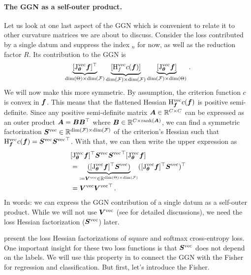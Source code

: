 \paragraph{The GGN as a self-outer product.}
Let us look at one last aspect of the GGN which is convenient to relate it to other curvature matrices we are about to discuss.
Consider the loss contributed by a single datum and suppress the index $_n$ for now, as well as the reduction factor $R$.
Its contribution to the GGN is
\begin{align*}
  \underbrace{[\mathrm{J}_{{\bm{\theta}}}^{\operatorname{vec}} {\bm{f}}]^{\top}}_{\dim(\Theta) \times \dim({\mathcal{F}})}
  \underbrace{[\mathrm{H}^{\operatorname{vec}}_{f} c({\bm{f}})]}_{\dim({\mathcal{F}}) \times \dim({\mathcal{F}})}
  \underbrace{[\mathrm{J}_{{\bm{\theta}}}^{\operatorname{vec}} {\bm{f}}]}_{\dim({\mathcal{F}}) \times \dim(\Theta)}\,.
\end{align*}
We will now make this more symmetric.
By assumption, the criterion function $c$ is convex in ${\bm{f}}$.
This means that the flattened Hessian $\mathrm{H}^{\operatorname{vec}}_{{\bm{f}}} c({\bm{f}})$ is positive semi-definite.
Since any positive semi-definite matrix ${\bm{A}} \in {\mathbb{R}}^{C \times C}$ can be expressed as an outer product ${\bm{A}} = {\bm{B}} {\bm{B}}^{\top}$ where ${\bm{B}} \in {\mathbb{R}}^{C \times \operatorname{rank}({\bm{A}})}$, we can find a symmetric factorization ${\bm{S}}^{\operatorname{vec}} \in {\mathbb{R}}^{\dim({\mathcal{F}}) \times \dim({\mathcal{F}})}$ of the criterion's Hessian such that $\mathrm{H}^{\operatorname{vec}}_{{\bm{f}}} c({\bm{f}}) = {\bm{S}}^{\operatorname{vec}} {{\bm{S}}^{\operatorname{vec}}}^{\top}$.
With that, we can then write the upper expression as
\begin{align*}
  &[\mathrm{J}_{{\bm{\theta}}}^{\operatorname{vec}} {\bm{f}}]^{\top} {\bm{S}}^{\operatorname{vec}} {{\bm{S}}^{\operatorname{vec}}}^{\top} [\mathrm{J}_{{\bm{\theta}}}^{\operatorname{vec}} {\bm{f}}]
  \\
  &=
    \underbrace{([\mathrm{J}_{{\bm{\theta}}}^{\operatorname{vec}} {\bm{f}}]^{\top} {\bm{S}}^{\operatorname{vec}})}_{\coloneq {\bm{V}}^{\operatorname{vec}} \in {\mathbb{R}}^{\dim(\Theta) \times \dim({\mathcal{F}})}}
    ([\mathrm{J}_{{\bm{\theta}}}^{\operatorname{vec}} {\bm{f}}]^{\top} {\bm{S}}^{\operatorname{vec}})^{\top}
  \\
  &=
    {\bm{V}}^{\operatorname{vec}} {{\bm{V}}^{\operatorname{vec}}}^{\top}\,.
\end{align*}
In words: we can express the GGN contribution of a single datum as a self-outer product.
While we will not use ${\bm{V}}^{\operatorname{vec}}$ (see \eg \citet{dangel2022vivit,ren2019efficient} for detailed discussions), we need the loss Hessian factorization (${\bm{S}}^{\operatorname{vec}}$) later.

 present the loss Hessian factorizations of square and softmax cross-entropy loss.
One important insight for these two loss functions is that ${\bm{S}}^{\operatorname{vec}}$ does not depend on the labels.
We will use this property in  to connect the GGN with the Fisher for regression and classification.
But first, let's introduce the Fisher.

